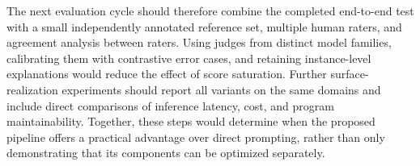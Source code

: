 The next evaluation cycle should therefore combine the completed end-to-end
test with a small independently annotated reference set, multiple human raters,
and agreement analysis between raters. Using judges from distinct model
families, calibrating them with contrastive error cases, and retaining
instance-level explanations would reduce the effect of score saturation.
Further surface-realization experiments should report all variants on the same
domains and include direct comparisons of inference latency, cost, and program
maintainability. Together, these steps would determine when the proposed
pipeline offers a practical advantage over direct prompting, rather than only
demonstrating that its components can be optimized separately.
